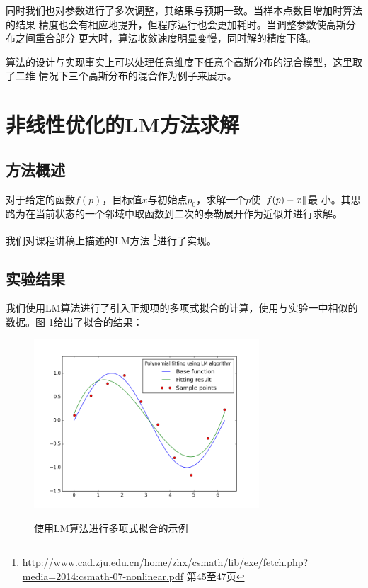 \documentclass[10pt,a4paper]{article}
\theoremstyle{mythm}%
\numberwithin{equation}{section}
\DeclarePairedDelimiter\norm{\lVert}{\rVert}%
\begin{document}
\begin{CJK*}{UTF8}{wqyzh}
同时我们也对参数进行了多次调整，其结果与预期一致。当样本点数目增加时算法的结果
精度也会有相应地提升，但程序运行也会更加耗时。当调整参数使高斯分布之间重合部分
更大时，算法收敛速度明显变慢，同时解的精度下降。

算法的设计与实现事实上可以处理任意维度下任意个高斯分布的混合模型，这里取了二维
情况下三个高斯分布的混合作为例子来展示。


\section{非线性优化的LM方法求解}

\subsection{方法概述}

对于给定的函数$f(p)$，目标值$x$与初始点$p_0$，求解一个$p$使$\norm{f(p) - x}$最
小。其思路为在当前状态的一个邻域中取函数到二次的泰勒展开作为近似并进行求解。

我们对课程讲稿上描述的LM方法
\footnote{\url{http://www.cad.zju.edu.cn/home/zhx/csmath/lib/exe/fetch.php?media=2014:csmath-07-nonlinear.pdf}
第45至47页}进行了实现。

\subsection{实验结果}

我们使用LM算法进行了引入正规项的多项式拟合的计算，使用与实验一中相似的数据。图
\ref{fig:lm}给出了拟合的结果：

\begin{figure}[h]
    \centering
    \def\_width{0.75\textwidth}
    \includegraphics[width=\_width]{figs/lm-0.png}
    \caption{
        使用LM算法进行多项式拟合的示例
    }{}
    \label{fig:lm}
\end{figure}


\end{CJK*}
\end{document}
